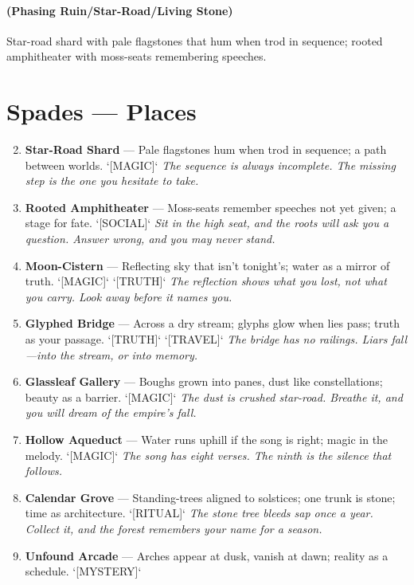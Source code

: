 \paragraph*{(Phasing Ruin/Star-Road/Living Stone)} Star-road shard with pale flagstones that hum when trod in sequence; rooted amphitheater with moss-seats remembering speeches.

\section*{Spades --- Places}
\label{sec:valewood-places}
\begin{enumerate}
\setcounter{enumi}{1}
\item \textbf{Star-Road Shard} --- Pale flagstones hum when trod in sequence; a path between worlds. `[MAGIC]`
  \hfill \textit{The sequence is always incomplete. The missing step is the one you hesitate to take.}
\item \textbf{Rooted Amphitheater} --- Moss-seats remember speeches not yet given; a stage for fate. `[SOCIAL]`
  \hfill \textit{Sit in the high seat, and the roots will ask you a question. Answer wrong, and you may never stand.}
\item \textbf{Moon-Cistern} --- Reflecting sky that isn't tonight's; water as a mirror of truth. `[MAGIC]` `[TRUTH]`
  \hfill \textit{The reflection shows what you lost, not what you carry. Look away before it names you.}
\item \textbf{Glyphed Bridge} --- Across a dry stream; glyphs glow when lies pass; truth as your passage. `[TRUTH]` `[TRAVEL]`
  \hfill \textit{The bridge has no railings. Liars fall---into the stream, or into memory.}
\item \textbf{Glassleaf Gallery} --- Boughs grown into panes, dust like constellations; beauty as a barrier. `[MAGIC]`
  \hfill \textit{The dust is crushed star-road. Breathe it, and you will dream of the empire's fall.}
\item \textbf{Hollow Aqueduct} --- Water runs uphill if the song is right; magic in the melody. `[MAGIC]`
  \hfill \textit{The song has eight verses. The ninth is the silence that follows.}
\item \textbf{Calendar Grove} --- Standing-trees aligned to solstices; one trunk is stone; time as architecture. `[RITUAL]`
  \hfill \textit{The stone tree bleeds sap once a year. Collect it, and the forest remembers your name for a season.}
\item \textbf{Unfound Arcade} --- Arches appear at dusk, vanish at dawn; reality as a schedule. `[MYSTERY]`

\end{enumerate}
